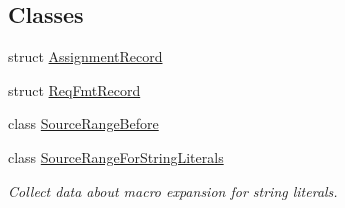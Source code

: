\subsection*{Classes}
\begin{DoxyCompactItemize}
\item 
struct \hyperlink{structclang_1_1tidy_1_1pagesjaunes_1_1_exec_s_q_l_prepare_fmtd_to_function_call_1_1_assignment_record}{Assignment\+Record}
\item 
struct \hyperlink{structclang_1_1tidy_1_1pagesjaunes_1_1_exec_s_q_l_prepare_fmtd_to_function_call_1_1_req_fmt_record}{Req\+Fmt\+Record}
\item 
class \hyperlink{classclang_1_1tidy_1_1pagesjaunes_1_1_exec_s_q_l_prepare_fmtd_to_function_call_1_1_source_range_before}{Source\+Range\+Before}
\item 
class \hyperlink{classclang_1_1tidy_1_1pagesjaunes_1_1_exec_s_q_l_prepare_fmtd_to_function_call_1_1_source_range_for_string_literals}{Source\+Range\+For\+String\+Literals}
\begin{DoxyCompactList}\small\item\em Collect data about macro expansion for string literals. \end{DoxyCompactList}\end{DoxyCompactItemize}
